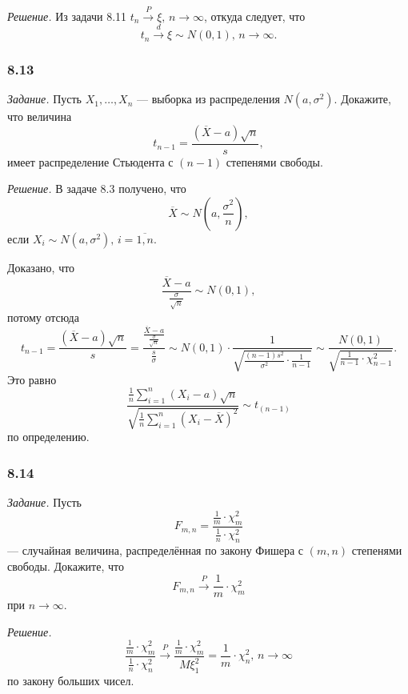\textit{Решение.}
Из задачи 8.11 $t_n \overset{P}{ \rightarrow } \xi, \, n \to \infty $, откуда следует,
что
$$t_n \overset{d}{ \rightarrow} \xi \sim N \left( 0, 1 \right), \,
  n \to \infty.$$

\subsubsection*{8.13}

\textit{Задание.}
Пусть $X_1, \dotsc, X_n$ --- выборка из распределения $N \left( a, \sigma^2 \right) $.
Докажите, что величина
$$t_{n - 1} =
  \frac{ \left( \overline{X} - a \right) \sqrt{n}}{s},$$
имеет распределение Стьюдента с $ \left( n - 1 \right) $ степенями свободы.

\textit{Решение.} В задаче 8.3 получено, что
$$ \overline{X} \sim
  N \left( a, \frac{ \sigma^2}{n} \right),$$
если $X_i \sim N \left( a, \sigma^2 \right), \, i = \overline{1, n}$.

Доказано, что
$$ \frac{ \overline{X} - a}{ \frac{ \sigma }{ \sqrt{n}}} \sim
  N \left( 0, 1 \right),$$
потому отсюда
$$t_{n - 1} =
  \frac{ \left( \overline{X} - a \right) \sqrt{n}}{s} =
  \frac{ \frac{ \overline{X} - a}{ \frac{ \sigma }{ \sqrt{n}}}}{ \frac{s}{ \sigma }} \sim
  N \left( 0, 1 \right) \cdot
  \frac{1}{ \sqrt{ \frac{ \left( n - 1 \right) s^2}{ \sigma^2} \cdot \frac{1}{n - 1}}} \sim
  \frac{N \left( 0, 1 \right) }{ \sqrt{ \frac{1}{n - 1} \cdot \chi_{n - 1}^2}}.$$
Это равно
$$ \frac{ \frac{1}{n} \sum \limits_{i = 1}^n \left( X_i - a \right) \sqrt{n}}{ \sqrt{ \frac{1}{n} \sum \limits_{i = 1}^n \left( X_i - \overline{X} \right)^2}} \sim
  t_{ \left( n - 1 \right) }$$
по определению.

\subsubsection*{8.14}

\textit{Задание.} Пусть
$$F_{m, n} =
  \frac{ \frac{1}{m} \cdot \chi_m^2}{ \frac{1}{n} \cdot \chi_n^2}$$
--- случайная величина, распределённая по закону Фишера с $ \left( m, n \right) $ степенями свободы.
Докажите, что
$$F_{m, n} \overset{P}{ \rightarrow }
  \frac{1}{m} \cdot \chi_m^2$$
при $n \to \infty $.

\textit{Решение.}
$$ \frac{ \frac{1}{m} \cdot \chi_m^2}{ \frac{1}{n} \cdot \chi_n^2} \overset{P}{ \rightarrow }
  \frac{ \frac{1}{m} \cdot \chi_m^2}{M \xi_1^2} =
  \frac{1}{m} \cdot \chi_n^2, \,
  n \to \infty $$
по закону больших чисел.
